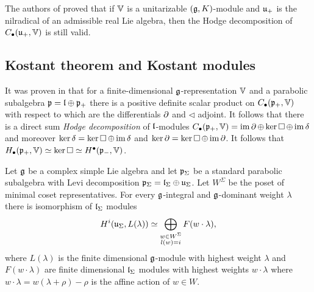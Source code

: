 The authors of \cite{huang_dirac_2006} proved that if $\mathbb{V}$ is a unitarizable $(\mathfrak{g},K)$-module and $\mathfrak{u}_+$ is the nilradical of an admissible real Lie algebra, then the Hodge decomposition of $C_\bullet(\mathfrak{u}_+,\mathbb{V})$ is still valid. 

\subsection{Kostant theorem and Kostant modules}



It was proven in \cite{kostant_lie_1961} that for a finite-dimensional $\mathfrak{g}$-representation $\mathbb{V}$ and a parabolic subalgebra $\mathfrak{p} = \mathfrak{l} \oplus \mathfrak{p}_+$ there is a positive definite scalar product on $C_\bullet(\mathfrak{p}_+,\mathbb{V})$ with respect to which are the differentials $\operatorname{\partial}$ and $\lhd$ adjoint. It follows that there is a direct sum \emph{Hodge decomposition} of $\mathfrak{l}$-modules $C_\bullet(\mathfrak{p}_+,\mathbb{V})=\operatorname{\mathrm{im}} \operatorname{\partial} \oplus  \ker \operatorname{\square} \oplus \operatorname{\mathrm{im}} \operatorname{\delta}$ and moreover $\ker \operatorname{\delta} = \ker \operatorname{\square} \oplus \operatorname{\mathrm{im}} \operatorname{\delta}$ and $\ker \operatorname{\partial} = \ker \operatorname{\square} \oplus \operatorname{\mathrm{im}} \operatorname{\partial}$. It follows that $H_\bullet(\mathfrak{p}_+,\mathbb{V})\simeq \ker \operatorname{\square} \simeq H^\bullet(\mathfrak{p}_-,\mathbb{V})$.

\begin{theorem}
	Let $\mathfrak{g}$ be a complex simple Lie algebra and let $\mathfrak{p}_\Sigma$ be a standard parabolic subalgebra with Levi decomposition $\mathfrak{p}_\Sigma = \mathfrak{l}_\Sigma \oplus \mathfrak{u}_\Sigma$. Let $W^\Sigma$ be the poset of minimal coset representatives. For every $\mathfrak{g}$-integral and $\mathfrak{g}$-dominant weight $\lambda$ there is isomorphism of $\mathfrak{l}_\Sigma$ modules
	\begin{equation}
		 H^i(\mathfrak{u}_\Sigma, L(\lambda))\simeq \bigoplus_{\substack{w\in W^{\Sigma}\\ l(w) = i}} F(w \cdot \lambda),
	\end{equation}
	where $L(\lambda)$ is the finite dimensional $\mathfrak{g}$-module with highest weight $\lambda$ and $F(w\cdot \lambda)$ are finite dimensional $\mathfrak{l}_\Sigma$ modules with highest weights $w \cdot \lambda$ where $w \cdot \lambda = w(\lambda + \rho) - \rho$ is the affine action of $w \in W.$
\end{theorem}

